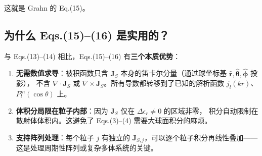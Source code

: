 这就是 Grahn 的 Eq.(15)。

\subsection{为什么 Eqs.(15)--(16) 是实用的？}

\begin{important}
与 Eqs.(13)--(14) 相比，Eqs.(15)--(16) 有\textbf{三个本质优势}：
\begin{enumerate}
  \item \textbf{无需数值求导}：被积函数只含 $\mathbf{J}_S$ 本身的笛卡尔分量（通过球坐标基 $\hat{\mathbf{r}},\hat{\boldsymbol{\theta}},\hat{\boldsymbol{\phi}}$ 投影），
    不含 $\nabla\cdot\mathbf{J}_S$ 或 $\nabla\times\mathbf{J}_S$。所有导数都转移到了已知的解析函数
    $j_l(kr)$、$P_l^m(\cos\theta)$ 上。
  \item \textbf{体积分局限在粒子内部}：因为 $\mathbf{J}_S$ 仅在 $\Delta\epsilon_r \neq 0$ 的区域非零，
    积分自动限制在散射体体积内。这避免了 Eqs.(3)--(4) 需要大球面积分的麻烦。
  \item \textbf{支持阵列处理}：每个粒子 $j$ 有独立的 $\mathbf{J}_{S,j}$，可以逐个粒子积分再线性叠加——
    这是处理周期性阵列或复杂多体系统的关键。
\end{enumerate}
\end{important}

